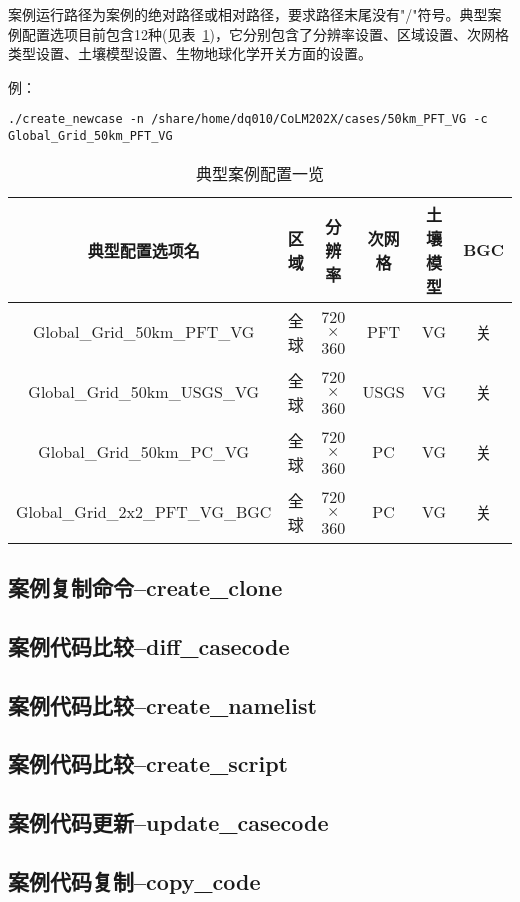 \documentclass[a4paper,12pt,twoside]{article}
\begin{document}
案例运行路径为案例的绝对路径或相对路径，要求路径末尾没有"/"符号。典型案例配置选项目前包含12种(见表~\ref{tab:cases_config})，它分别包含了分辨率设置、区域设置、次网格类型设置、土壤模型设置、生物地球化学开关方面的设置。


例：
\begin{lstlisting}
./create_newcase -n /share/home/dq010/CoLM202X/cases/50km_PFT_VG -c Global_Grid_50km_PFT_VG
\end{lstlisting}

\begin{table}[!htbp]
\renewcommand{\arraystretch}{1.5}
\centering 
\caption{典型案例配置一览}\label{tab:cases_config}
\begin{tabular}{
cccccc} \toprule
\textbf{典型配置选项名} & \textbf{区域} & \textbf{分辨率} & \textbf{次网格} & \textbf{土壤模型} & \textbf{BGC}\\ \midrule
Global\_Grid\_50km\_PFT\_VG & 全球 & 720$\times$360 & PFT & VG & 关\\
Global\_Grid\_50km\_USGS\_VG & 全球 & 720$\times$360 & USGS & VG & 关\\
Global\_Grid\_50km\_PC\_VG & 全球 & 720$\times$360 & PC & VG & 关\\
Global\_Grid\_2x2\_PFT\_VG\_BGC & 全球 & 720$\times$360 & PC & VG & 关\\
\bottomrule
\end{tabular}
\end{table}

\subsection{案例复制命令--create\_clone}

\subsection{案例代码比较--diff\_casecode}

\subsection{案例代码比较--create\_namelist}

\subsection{案例代码比较--create\_script}

\subsection{案例代码更新--update\_casecode}

\subsection{案例代码复制--copy\_code}
\end{document}
